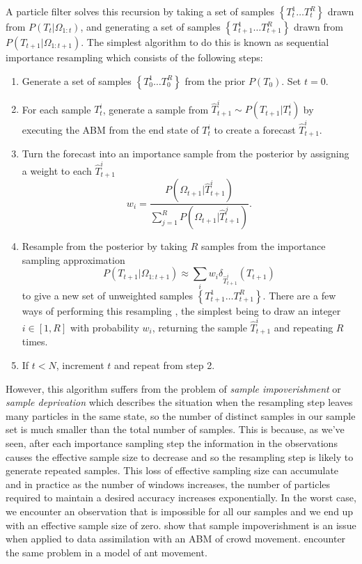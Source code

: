 \documentclass{article}
\begin{document}
A particle filter solves this recursion by taking a set of samples $\left\{T_t^1 \dots T_t^R\right\}$ drawn from $P(T_t|\Omega_{1:t})$, and generating a set of samples  $\left\{T_{t+1}^1 \dots T_{t+1}^R\right\}$ drawn from $P(T_{t+1}|\Omega_{1:t+1})$. The simplest algorithm to do this is known as sequential importance resampling which consists of the following steps:
\begin{enumerate}
\item Generate a set of samples $\left\{T^1_0 \dots T^R_0\right\}$ from the prior $P(T_0)$. Set $t=0$.

\item For each sample $T_t^i$, generate a sample from $\hat{T}_{t+1}^i \sim P(T_{t+1}|T^i_t)$ by executing the ABM from the end state of $T^i_t$ to create a forecast $\hat{T}_{t+1}^i$.

\item Turn the forecast into an importance sample from the posterior by assigning a weight to each $\hat{T}_{t+1}^i$
\[
w_i = \frac{P(\Omega_{t+1}|\hat{T}_{t+1}^i)}{\sum_{j=1}^R P(\Omega_{t+1}|\hat{T}_{t+1}^j)}.
\]

\item Resample from the posterior by taking $R$ samples from the importance sampling approximation
\begin{equation}
P(T_{t+1}|\Omega_{1:t+1}) \approx  \sum_i w_i\delta_{\hat{T}_{t+1}^i}\left(T_{t+1}\right)
\label{importanceApprox}
\end{equation}
to give a new set of unweighted samples $\left\{T^1_{t+1} \dots T^R_{t+1}\right\}$. There are a few ways of performing this resampling \citep{douc2005comparison}, the simplest being to draw an integer $i\in[1,R]$ with probability $w_i$, returning the sample $\hat{T}_{t+1}^i$ and repeating $R$ times.

\item If $t<N$, increment $t$ and repeat from step 2.

\end{enumerate}

However, this algorithm suffers from the problem of \textit{sample impoverishment} \citep{li2014fight} or \textit{sample deprivation} which describes the situation when the resampling step leaves many particles in the same state, so the number of distinct samples in our sample set is much smaller than the total number of samples. This is because, as we've seen, after each importance sampling step the information in the observations causes the effective sample size to decrease and so the resampling step is likely to generate repeated samples. This loss of effective sampling size can accumulate and in practice as the number of windows increases, the number of particles required to maintain a desired accuracy increases exponentially. In the worst case, we encounter an observation that is impossible for all our samples and we end up with an effective sample size of zero. \citet{malleson_simulating_2020} show that sample impoverishment is an issue when applied to data assimilation with an ABM of crowd movement. \citet{khan2003efficient} encounter the same problem in a model of ant movement.
\end{document}
